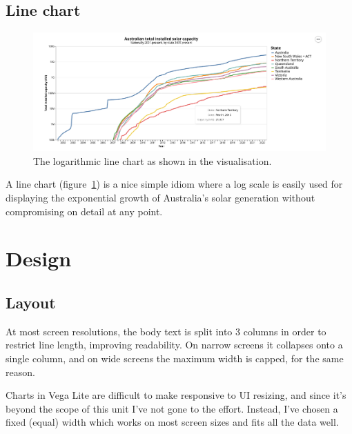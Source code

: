 \documentclass[12pt,letterpaper]{article}
\begin{document}
\begin{multicols}{2}
    \subsection*{Line chart}

    \begin{figure}[H]
        \centering
        \includegraphics[width=\linewidth]{images/line.png}
        \caption{The logarithmic line chart as shown in the visualisation.}
        \label{fig:line}
    \end{figure}

    A line chart (figure~\ref{fig:line}) is a nice simple idiom where a log scale is easily used for displaying the exponential growth of Australia's solar generation without compromising on detail at any point.

    \section*{Design}

    \subsection*{Layout}

    At most screen resolutions, the body text is split into 3 columns in order to restrict line length, improving readability. On narrow screens it collapses onto a single column, and on wide screens the maximum width is capped, for the same reason.

    Charts in Vega Lite are difficult to make responsive to UI resizing, and since it's beyond the scope of this unit I've not gone to the effort. Instead, I've chosen a fixed (equal) width which works on most screen sizes and fits all the data well.


\end{multicols}
\end{document}
